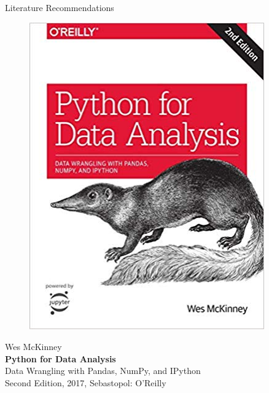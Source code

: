 \documentclass[main.tex]{subfiles}
\begin{document}
\begin{frame}{Literature Recommendations}
\begin{minipage}{0.1\textwidth}
\begin{figure}[H]
                \includegraphics[height=0.2\textheight, width=0.9\textwidth, left]{assets/book-covers/mckinney2017.jpg}
            \end{figure}
        \end{minipage}
        \begin{minipage}{0.39\textwidth}
            \footnotesize Wes McKinney \normalsize \\[-0.5mm]
            \small \textbf{Python for Data Analysis} \\[-0.8mm]
            Data Wrangling with Pandas, NumPy, and IPython \normalsize \\
            \tiny Second Edition, 2017, Sebastopol: O'Reilly \normalsize
        \end{minipage}
        

\end{frame}
\end{document}
